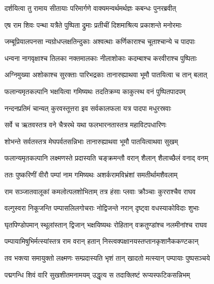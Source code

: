
\twolineshloka
{दर्शयित्वा तु रामाय सीतायाः परिमार्गणे}
{वाक्यमन्वर्थमर्थज्ञः कबन्धः पुनरब्रवीत्} %

\twolineshloka
{एष राम शिवः पन्था यत्रैते पुष्पिता द्रुमाः}
{प्रतीचीं दिशमाश्रित्य प्रकाशन्ते मनोरमाः} %

\twolineshloka
{जम्बूप्रियालपनसा न्यग्रोधप्लक्षतिन्दुकाः}
{अश्वत्थाः कर्णिकाराश्च चूताश्चान्ये च पादपाः} %

\twolineshloka
{धन्वना नागवृक्षाश्च तिलका नक्तमालकाः}
{नीलाशोकाः कदम्बाश्च करवीराश्च पुष्पिताः} %

\twolineshloka
{अग्निमुख्या अशोकाश्च सुरक्ताः पारिभद्रकाः}
{तानारुह्याथवा भूमौ पातयित्वा च तान् बलात्} %

\twolineshloka
{फलान्यमृतकल्पानि भक्षयित्वा गमिष्यथः}
{तदतिक्रम्य काकुत्स्थ वनं पुष्पितपादपम्} %

\twolineshloka
{नन्दनप्रतिमं चान्यत् कुरवस्तूत्तरा इव}
{सर्वकालफला यत्र पादपा मधुरस्रवाः} %

\twolineshloka
{सर्वे च ऋतवस्तत्र वने चैत्ररथे यथा}
{फलभारनतास्तत्र महाविटपधारिणः} %

\twolineshloka
{शोभन्ते सर्वतस्तत्र मेघपर्वतसन्निभाः}
{तानारुह्याथवा भूमौ पातयित्वाथवा सुखम्} %

\twolineshloka
{फलान्यमृतकल्पानि लक्ष्मणस्ते प्रदास्यति}
{चङ्क्रमन्तौ वरान् शैलान् शैलाच्छैलं वनाद् वनम्} %

\twolineshloka
{ततः पुष्करिणीं वीरौ पम्पां नाम गमिष्यथः}
{अशर्करामविभ्रंशां समतीर्थामशैवलाम्} %

\twolineshloka
{राम सञ्जातवालूकां कमलोत्पलशोभिताम्}
{तत्र हंसाः प्लवाः क्रौञ्चाः कुरराश्चैव राघव} %

\twolineshloka
{वल्गुस्वरा निकूजन्ति पम्पासलिलगोचराः}
{नोद्विजन्ते नरान् दृष्ट्वा वधस्याकोविदाः शुभाः} %

\twolineshloka
{घृतपिण्डोपमान् स्थूलांस्तान् द्विजान् भक्षयिष्यथः}
{रोहितान् वक्रतुण्डांश्च नलमीनांश्च राघव} %

\twolineshloka
{पम्पायामिषुभिर्मत्स्यांस्तत्र राम वरान् हतान्}
{निस्त्वक्पक्षानयस्तप्तानकृशानैककण्टकान्} %

\twolineshloka
{तव भक्त्या समायुक्तो लक्ष्मणः सम्प्रदास्यति}
{भृशं तान् खादतो मत्स्यान् पम्पायाः पुष्पसञ्चये} %

\twolineshloka
{पद्मगन्धि शिवं वारि सुखशीतमनामयम्}
{उद्धृत्य स तदाक्लिष्टं रूप्यस्फटिकसन्निभम्} %

